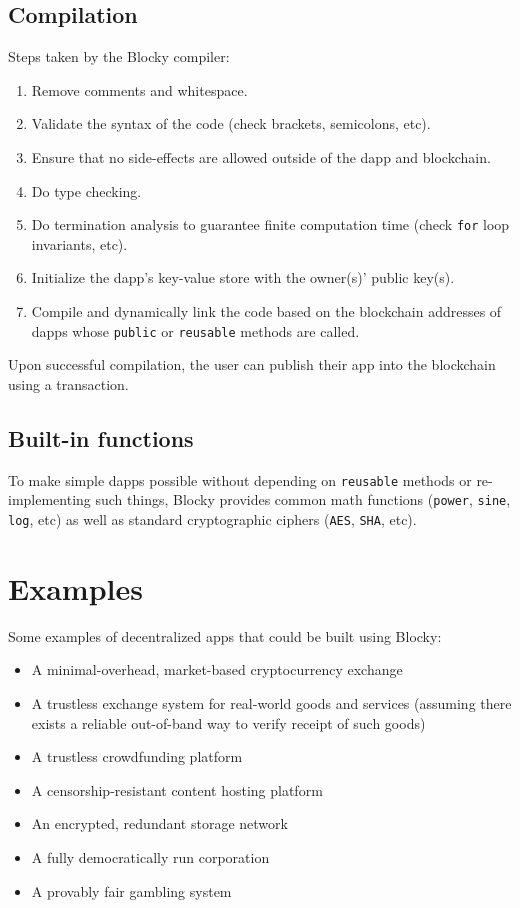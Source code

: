 \documentclass[letterpaper]{article}
\begin{document}
\subsection{Compilation}
Steps taken by the Blocky compiler:
\begin{enumerate}
  \item{Remove comments and whitespace.}
  \item{Validate the syntax of the code (check brackets, semicolons, etc).}
  \item{Ensure that no side-effects are allowed outside of the dapp and blockchain.}
  \item{Do type checking.}
  \item{Do termination analysis to guarantee finite computation time (check \texttt{for} loop invariants, etc).}
  \item{Initialize the dapp's key-value store with the owner(s)' public key(s).}
  \item{Compile and dynamically link the code based on the blockchain addresses of dapps whose \texttt{public} or \texttt{reusable} methods are called.}
\end{enumerate}

Upon successful compilation, the user can publish their app into the blockchain using a transaction.

\subsection{Built-in functions}
To make simple dapps possible without depending on \texttt{reusable} methods or re-implementing such things, Blocky provides common math functions (\texttt{power}, \texttt{sine}, \texttt{log}, etc) as well as standard cryptographic ciphers (\texttt{AES}, \texttt{SHA}, etc).

\section{Examples}

Some examples of decentralized apps that could be built using Blocky:
\begin{itemize}
  \item{A minimal-overhead, market-based cryptocurrency exchange}
  \item{A trustless exchange system for real-world goods and services (assuming there exists a reliable out-of-band way to verify receipt of such goods)}
  \item{A trustless crowdfunding platform}
  \item{A censorship-resistant content hosting platform}
  \item{An encrypted, redundant storage network}
  \item{A fully democratically run corporation}
  \item{A provably fair gambling system}
\end{itemize}
\end{document}
